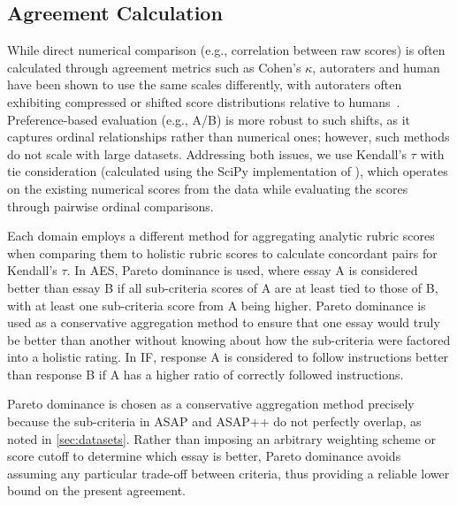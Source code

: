 \subsection{Agreement Calculation}

While direct numerical comparison (e.g., correlation between raw scores) is often calculated through agreement metrics such as Cohen's $\kappa$, autoraters and human have been shown to use the same scales differently, with autoraters often exhibiting compressed or shifted score distributions relative to humans~\cite{kundu2024large}. Preference-based evaluation (e.g., A/B) is more robust to such shifts, as it captures ordinal relationships rather than numerical ones; however, such methods do not scale with large datasets. Addressing both issues, we use Kendall's $\tau$ with tie consideration (calculated using the SciPy \citep{virtanen_scipy_2020} implementation of \citep{df984cd0-5ddb-387f-ae81-1c7b41e92c35}), which operates on the existing numerical scores from the data while evaluating the scores through pairwise ordinal comparisons.

Each domain employs a different method for aggregating analytic rubric scores when comparing them to holistic rubric scores to calculate concordant pairs for Kendall's $\tau$. In AES, Pareto dominance is used, where essay A is considered better than essay B if all sub-criteria scores of A are at least tied to those of B, with at least one sub-criteria score from A being higher. Pareto dominance is used as a conservative aggregation method to ensure that one essay would truly be better than another without knowing about how the sub-criteria were factored into a holistic rating. In IF, response A is considered to follow instructions better than response B if A has a higher ratio of correctly followed instructions.

Pareto dominance is chosen as a conservative aggregation method precisely because the sub-criteria in ASAP and ASAP++ do not perfectly overlap, as noted in \ref{sec:datasets}. Rather than imposing an arbitrary weighting scheme or score cutoff to determine which essay is better, Pareto dominance avoids assuming any particular trade-off between criteria, thus providing a reliable lower bound on the present agreement.

